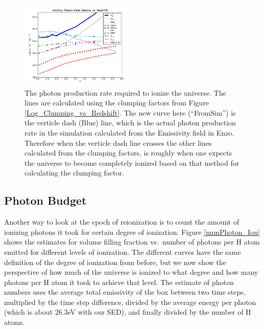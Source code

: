 \documentclass[letterpaper,10pt]{article}
\renewcommand{\(}{\left(}
\renewcommand{\)}{\right)}
\begin{document}
\begin{figure}
  \includegraphics[width=0.5\textwidth]{Photon_to_ionize.png}
  \caption{\footnotesize The photon production rate required to ionize
    the universe.  The lines are calculated using the clumping factors
    from Figure \ref{Log_Clumping_vs_Redshift}.  The new curve here
    (``FromSim'') is the verticle dash (Blue) line, which is the actual photon 
    production rate in the simulation calculated from the Emissivity
    field in Enzo.  Therefore when the verticle dash line crosses the
    other lines calculated from the clumping factors, is roughly when 
    one expects the universe to become completely ionized based on
    that method for calculating the clumping factor.} 
\label{Photon_vs_Redshift}
\end{figure}


\subsection{Photon Budget}

Another way to look at the epoch of reionization is to count the
amount of ionizing photons it took for certain degree of ionization.
Figure \ref{numPhoton_Ion} shows the estimates for volume filling
fraction vs.~number of photons per H atom emitted for different levels 
of ionization.  The different curves have the same definition of
the degree of ionization from before, but we now show the perspective
of how much of the universe is ionized to what degree and how many
photons per H atom it took to achieve that level. The estimate of
photon numbers uses the average total emissivity of the box between
two time steps, multiplied by the time step difference, divided by 
the average energy per photon (which is about 26.3eV with our SED),
and finally divided by the number of H atoms. 
\end{document}
